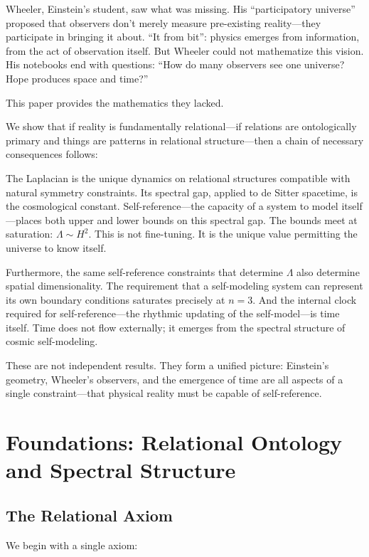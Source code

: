 \documentclass[11pt,a4paper]{article}
\theoremstyle{definition}
\theoremstyle{remark}
\begin{document}
Wheeler, Einstein's student, saw what was missing. His ``participatory universe'' proposed that observers don't merely measure pre-existing reality---they participate in bringing it about. ``It from bit'': physics emerges from information, from the act of observation itself. But Wheeler could not mathematize this vision. His notebooks end with questions: ``How do many observers see one universe? Hope produces space and time?''

This paper provides the mathematics they lacked.

We show that if reality is fundamentally relational---if relations are ontologically primary and things are patterns in relational structure---then a chain of necessary consequences follows:

The Laplacian is the unique dynamics on relational structures compatible with natural symmetry constraints. Its spectral gap, applied to de Sitter spacetime, is the cosmological constant. Self-reference---the capacity of a system to model itself---places both upper and lower bounds on this spectral gap. The bounds meet at saturation: $\Lambda \sim H^2$. This is not fine-tuning. It is the unique value permitting the universe to know itself.

Furthermore, the same self-reference constraints that determine $\Lambda$ also determine spatial dimensionality. The requirement that a self-modeling system can represent its own boundary conditions saturates precisely at $n = 3$. And the internal clock required for self-reference---the rhythmic updating of the self-model---is time itself. Time does not flow externally; it emerges from the spectral structure of cosmic self-modeling.

These are not independent results. They form a unified picture: Einstein's geometry, Wheeler's observers, and the emergence of time are all aspects of a single constraint---that physical reality must be capable of self-reference.

\section{Foundations: Relational Ontology and Spectral Structure}

\subsection{The Relational Axiom}

We begin with a single axiom:
\end{document}
